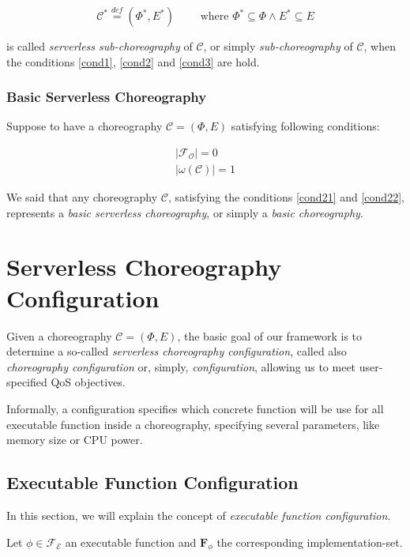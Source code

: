 \documentclass[10pt,a4paper]{report}
\newcommand{\mathDef}{\overset{\textit{def}}{=}}
\theoremstyle{definition}
\begin{document}
\begin{equation}
	\mathcal{C}^* \mathDef (\Phi^*,E^*) \qquad \text{ where } \Phi^* \subseteq \Phi \wedge E^* \subseteq E
\end{equation}

is called \textit{serverless sub-choreography} of $\mathcal{C}$, or simply \textit{sub-choreography} of $\mathcal{C}$, when the conditions \ref{cond1}, \ref{cond2} and \ref{cond3} are hold.

\subsubsection{Basic Serverless Choreography}\label{BasicDefinition}

Suppose to have a choreography $\mathcal{C} = (\Phi,E)$ satisfying following conditions:

\begin{eqnarray}
	|\mathscr{F_O}| = 0 \label{cond21} \\
	|\omega(\mathcal{C})| = 1 \label{cond22}
\end{eqnarray}

We said that any choreography $\mathcal{C}$, satisfying the conditions \ref{cond21} and \ref{cond22}, represents a \textit{basic serverless choreography}, or simply a \textit{basic choreography}.

\section{Serverless Choreography Configuration}

Given a choreography $\mathcal{C} = (\Phi,E)$, the basic goal of our framework is to determine a so-called \textit{serverless choreography configuration}, called also \textit{choreography configuration} or, simply, \textit{configuration}, allowing us to meet user-specified QoS objectives.

Informally, a configuration specifies which concrete function will be use for all executable function inside a choreography, specifying several parameters, like memory size or CPU power.

\subsection{Executable Function Configuration}

In this section, we will explain the concept of \textit{executable function configuration}. 

Let $\phi \in \mathscr{F_E}$ an executable function and $\textbf{F}_{\phi}$ the corresponding implementation-set.
\end{document}

